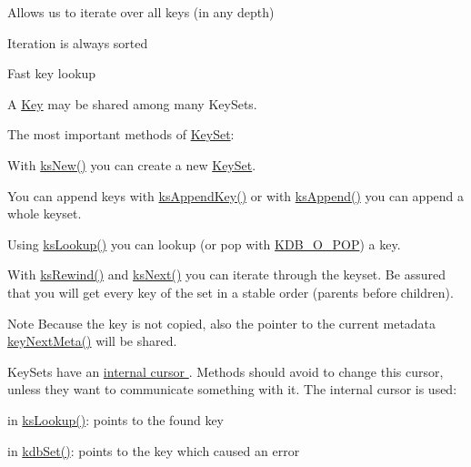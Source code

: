 \begin{DoxyItemize}
\item Allows us to iterate over all keys (in any depth)
\item Iteration is always sorted
\item Fast key lookup
\item A \hyperlink{classkdb_1_1Key}{Key} may be shared among many Key\+Sets.
\end{DoxyItemize}

The most important methods of \hyperlink{classkdb_1_1KeySet}{Key\+Set}\+:


\begin{DoxyItemize}
\item With \hyperlink{group__keyset_ga671e1aaee3ae9dc13b4834a4ddbd2c3c}{ks\+New()} you can create a new \hyperlink{classkdb_1_1KeySet}{Key\+Set}.
\item You can append keys with \hyperlink{group__keyset_gaa5a1d467a4d71041edce68ea7748ce45}{ks\+Append\+Key()} or with \hyperlink{group__keyset_ga21eb9c3a14a604ee3a8bdc779232e7b7}{ks\+Append()} you can append a whole keyset.
\item Using \hyperlink{group__keyset_ga60f1ddcf23272f2b29b90e92ebe9b56f}{ks\+Lookup()} you can lookup (or pop with \hyperlink{group__keyset_ggada05f4bbf46fde81d0d57df86e73d914a52fb5f2cc86773d393da62bebebf7984}{K\+D\+B\+\_\+\+O\+\_\+\+P\+OP}) a key.
\item With \hyperlink{group__keyset_gabe793ff51f1728e3429c84a8a9086b70}{ks\+Rewind()} and \hyperlink{group__keyset_ga317321c9065b5a4b3e33fe1c399bcec9}{ks\+Next()} you can iterate through the keyset. Be assured that you will get every key of the set in a stable order (parents before children).
\end{DoxyItemize}

\begin{DoxyNote}{Note}
Because the key is not copied, also the pointer to the current metadata \hyperlink{group__keymeta_ga4c88342f580a4291455a801af71ce048}{key\+Next\+Meta()} will be shared.
\end{DoxyNote}
Key\+Sets have an \hyperlink{group__keyset_ga4287b9416912c5f2ab9c195cb74fb094}{internal cursor }. Methods should avoid to change this cursor, unless they want to communicate something with it. The internal cursor is used\+:


\begin{DoxyItemize}
\item in \hyperlink{group__keyset_ga60f1ddcf23272f2b29b90e92ebe9b56f}{ks\+Lookup()}\+: points to the found key
\item in \hyperlink{group__kdb_ga11436b058408f83d303ca5e996832bcf}{kdb\+Set()}\+: points to the key which caused an error
\end{DoxyItemize}

